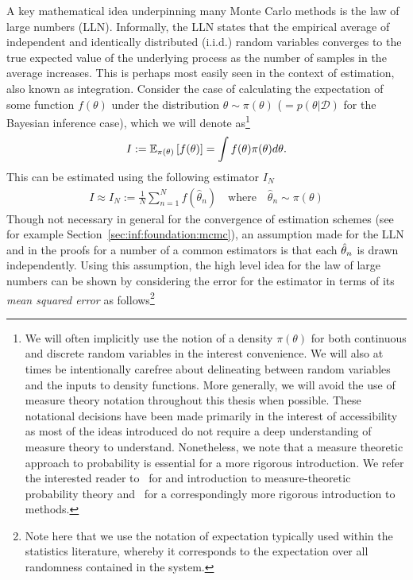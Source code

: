 A key mathematical idea underpinning many Monte Carlo methods is the law of large numbers (LLN).  
Informally, the LLN states that the empirical average of independent and identically distributed
(i.i.d.)  random variables converges to the true expected value of the underlying process as the number
of samples in the average increases.  This is perhaps most easily seen in the context of \mc estimation,
also known as \mc integration.  Consider the case of calculating the expectation of some function
$f(\theta)$ under the distribution $\theta\sim \pi(\theta)$ ($= p(\theta | \mathcal{D})$ for the Bayesian
inference case), which we will denote 
as\footnote{We will often implicitly use the notion of a density
	$\pi(\theta)$ for both continuous and discrete random variables in the interest
	convenience.  We will also at times be intentionally carefree about delineating between random
	variables and the inputs to density functions.  More generally, we will avoid the use of measure
	theory notation throughout this thesis when possible.  These notational decisions have been made
	primarily in the interest of accessibility as most of the ideas introduced do not require a deep
	understanding of measure theory to understand.  Nonetheless, we note that a measure theoretic
	approach to probability is essential for a more rigorous introduction.  We refer
	the interested reader to~\cite{durrett2010probability} for and introduction to measure-theoretic
	probability theory and~\cite{robert2004monte} for a correspondingly more rigorous introduction
	to \mc methods.}
\begin{align}
I:=\mathbb{E}_{\pi(\theta)} \left[f(\theta)\right]=\int f(\theta) \pi(\theta) d\theta.
\end{align}
This can be estimated using the following \mc estimator $I_N$
\begin{align}
	\label{eq:inf:mc-est}
	I \approx I_N := \frac{1}{N} \sum_{n=1}^{N}f(\hat{\theta}_n)
	\quad \text{where} \quad \hat{\theta}_n \sim \pi(\theta)
\end{align}
Though not necessary in general for the convergence of \mc estimation schemes
(see for example Section~\ref{sec:inf:foundation:mcmc}), an assumption made for the LLN
and in the proofs for a number of a common \mc estimators is that each $\hat{\theta}_n$ is drawn
independently.  Using this assumption, the high level idea for the law of large numbers can be shown by
considering the error for the \mc estimator in terms of its \emph{mean squared error} as 
follows\footnote{Note here that we use the notation of expectation typically used within the statistics literature,
whereby it corresponds to the expectation over all randomness contained in the system.}
